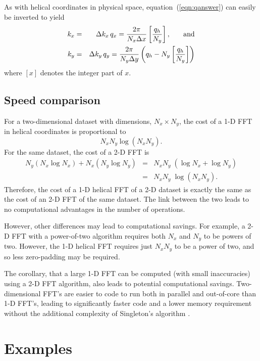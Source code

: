 \par
As with helical coordinates in physical space, 
equation~(\ref{eqn:qanswer}) can easily be inverted to yield
\begin{eqnarray}
k_x & = & \Delta k_x \, q_x = \frac{2 \pi}{N_x \Delta x} 
\left[ \frac{q_h}{N_y}\right], \hspace{0.25in} {\rm and} \\
k_y & = & \Delta k_y \, q_y = \frac{2 \pi}{N_y \Delta y}
\left(
q_h - N_y \left[ \frac{q_h}{N_y}\right]
\right)
\end{eqnarray}
where $[x]$ denotes the integer part of $x$. 

\subsection{Speed comparison}
For a two-dimensional dataset with dimensions, $N_x \times N_y$, the
cost of a 1-D FFT in helical coordinates is proportional to
\begin{equation}
N_x N_y \log \left( N_x N_y \right).
\end{equation}
For the same dataset, the cost of a 2-D FFT is 
\begin{eqnarray}
N_y \left( N_x \log N_x \right) + N_x \left( N_y \log N_y
\right)
& = & N_x N_y \; \left( \log N_x + \log N_y \right)  \nonumber \\
& = & N_x N_y \; \log \left( N_x N_y \right).
\end{eqnarray}
Therefore, the cost of a 1-D helical FFT of a 2-D dataset 
is exactly the same as the cost of an 2-D FFT of the same dataset.
The link between the two leads to no computational advantages in the
number of operations.

However, other differences may lead to computational savings.  For
example, a 2-D FFT with a power-of-two algorithm requires both $N_x$
and $N_y$ to be powers of two. However, the 1-D helical FFT requires
just $N_x N_y$ to be a power of two, and so less zero-padding may be
required.  

The corollary, that a large 1-D FFT 
can be computed (with small inaccuracies) using a 2-D FFT algorithm, 
also leads to potential computational savings.
Two-dimensional FFT's are easier to code to run both in parallel and
out-of-core than 1-D FFT's, leading to significantly faster code and a
lower memory requirement without the additional complexity of
Singleton's algorithm \cite{numrec}.

\section{Examples}

